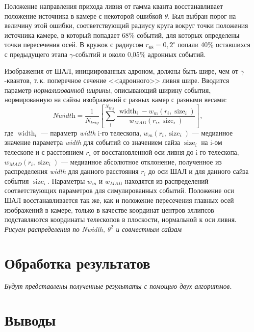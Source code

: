 \documentclass[magd,floatypics,numeref]{msudipl} %
\begin{document}
Положение направления прихода ливня от гамма кванта восстанавливает положение источника в камере с некоторой ошибкой $\theta$. Был выбран порог на величину этой ошибки, соответствующий радиусу круга вокруг точки положения источника камере, в который попадает 68\% событий, для которых определены точки пересечения осей. В кружок с радиусом $r_{68}=0{,}2^{\circ}$ попали 40\% оставшихся с предыдущего этапа $\gamma$-событий и около 0{,}05\% адронных событий.  

Изображения от ШАЛ, инициированных адроном, должны быть шире, чем от $\gamma$-квантов, т.\,к. поперечное сечение <<адронного>> ливня шире. 
Вводится параметр \textit{нормализованной ширины}, описывающий ширину события, нормированную на сайзы изображений с разных камер с разными весами:
\begin{equation}
\textit{Nwidth}=\frac{1}{N_{trig}}\left[\sum_{i}^{N_{\text {trig }}} \frac{\operatorname{width}_{i}-w_{m}\left(r_{i}, \operatorname{size}_{i}\right)}{w_{M A D}\left(r_{i}, \operatorname{size}_{i}\right)}\right],
\end{equation}
где $\operatorname{width}_i$ --- параметр \textit{width} i-го телескопа, $w_{m}\left(r_{i}, \operatorname{size}_{i}\right)$ --- медианное значение параметра \textit{width} для событий со значением сайза $\operatorname{size}_{i}$ на i-ом телескопе и с расстоянием $r_i$ от восстановленной оси ливня до i-го телескопа, $w_{MAD}(r_i, \operatorname{size}_{i})$ --- медианное абсолютное отклонение, полученное из распределения \textit{width} для данного расстояния $r_i$ до оси ШАЛ и для данного сайза события $\operatorname{size}_{i}$. 
Параметры $w_m$ и $w_{MAD}$ находятся из распределений соответствующих параметров для симулированных событий. Положение оси ШАЛ восстанавливается так же, как и положение пересечения главных осей изображений в камере, только в качестве координат центров эллипсов подставляются координаты телескопов в плоскости, нормальной к оси ливня. 
\textit{Рисуем распределения по Nwidth, $\theta^2$ и совместным сайзам}
 
\chapter{Обработка результатов}
\textit{Будут представлены полученные результаты с помощью двух алгоритмов. }
\chapter*{Выводы}   %


{}  %
\printbibliography[title=Литература]
\end{document}
